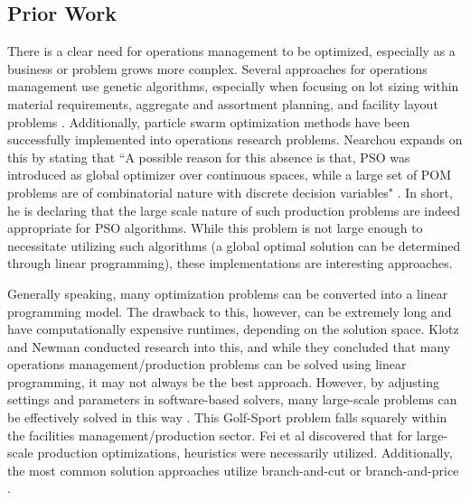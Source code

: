 \documentclass{article}
\begin{document}
\subsection{Prior Work}
There is a clear need for operations management to be optimized, especially as a business or problem grows more complex. Several approaches for operations management use genetic algorithms, especially when focusing on lot sizing within material requirements, aggregate and assortment planning, and facility layout problems \cite{gen}.  
Additionally, particle swarm optimization methods have been successfully implemented into operations research problems.  Nearchou expands on this by stating that ``A possible reason for this absence is that, PSO was introduced as global optimizer over continuous spaces, while a large set of POM problems are of combinatorial nature with discrete decision variables" \cite{and}.  In short, he is declaring that the large scale nature of such production problems are indeed appropriate for PSO algorithms.  
While this problem is not large enough to necessitate utilizing such algorithms (a global optimal solution can be determined through linear programming), these implementations are interesting approaches.
\par
Generally speaking, many optimization problems can be converted into a linear programming model.  The drawback to this, however, can be extremely long and have computationally expensive runtimes, depending on the solution space.  Klotz and Newman conducted research into this, and 
while they concluded that many operations management/production problems can be solved using linear programming, it may not always be the best approach.  However, by adjusting settings and parameters in software-based solvers, many large-scale problems can be effectively solved in this way \cite{klotz}.  This Golf-Sport problem falls squarely within the facilities management/production sector.  Fei et al discovered that for large-scale production optimizations, heuristics were necessarily utilized.  Additionally, the most common solution approaches utilize branch-and-cut or branch-and-price \cite{survey}.
\end{document}
